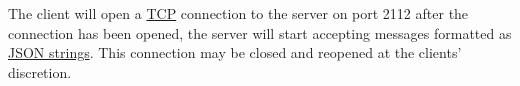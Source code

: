 The client will open a \href{https://en.wikipedia.org/wiki/Transmission_Control_Protocol}{TCP} 
connection to the server on port 2112 after the connection has been opened, 
the server will start accepting messages formatted as \href{https://en.wikipedia.org/wiki/JSON}{JSON strings}. 
This connection may be closed and reopened at the clients’ discretion.

